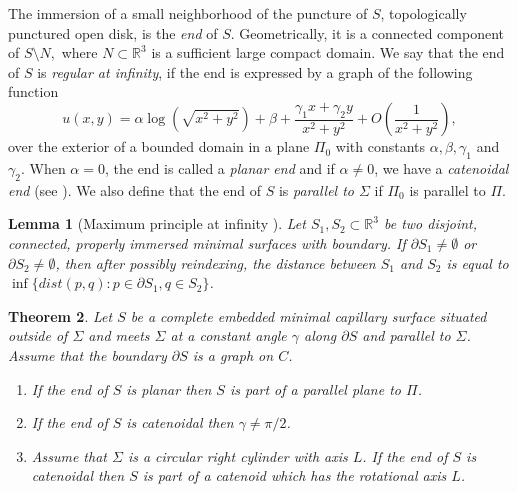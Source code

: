 \documentclass[12pt,a4paper]{amsart}
\newtheorem{theorem}{Theorem}
\newtheorem{lemma}[theorem]{Lemma}
\begin{document}
The immersion of a small neighborhood of the puncture of $S$, topologically punctured open disk, is the {\it end} of $S$. Geometrically, it is a connected component of $S\setminus N,$ where $N\subset{\mathbb R}^3$ is a sufficient large compact domain.
We say that the end of $S$ is {\it regular at infinity}, if the end is expressed by a graph of the following function
\begin{equation}\label{end}
u(x,y)=\alpha\log\left(\sqrt{x^2+y^2}\right)+\beta+\frac{\gamma_1x+\gamma_2y}{x^2+y^2}+O\left(\frac{1}{x^2+y^2}\right),
\end{equation}
over the exterior of a bounded domain in a plane $\Pi_0$ with constants $\alpha, \beta, \gamma_1$ and $\gamma_2$.
When $\alpha=0$, the end is called a {\it planar end} and if $\alpha\not=0$, we have a {\it catenoidal end} (see \cite{sch}).
We also define that the end of $S$ is {\it parallel to $\Sigma$} if $\Pi_0$ is parallel to $\Pi$.
\begin{lemma}[Maximum principle at infinity \cite{mr}] Let $S_1, S_2\subset {\mathbb R}^3$ be two disjoint, connected, properly immersed minimal surfaces with boundary. If $\partial S_1\not=\emptyset$ or $\partial S_2\not=\emptyset$, then after possibly reindexing, the distance between $S_1$ and $S_2$ is equal to $\inf \{dist(p,q) : p\in \partial S_1, q\in S_2\}$.
\end{lemma}
\begin{theorem}\label{t4}
Let $S$ be a complete embedded minimal capillary surface situated outside of $\Sigma$ and meets $\Sigma$ at a constant angle $\gamma$ along $\partial S$ and parallel to $\Sigma$. Assume that the boundary $\partial S$ is a graph on $C$.
\begin{enumerate}
\item If the end of $S$ is planar then $S$ is part of a parallel plane to $\Pi$.
\item If the end of $S$ is catenoidal then $\gamma\not=\pi/2$.
\item Assume that $\Sigma$ is a circular right cylinder with axis $L$. If the end of $S$ is catenoidal then $S$ is part of a catenoid which has the rotational axis $L$.
\end{enumerate}
\end{theorem}
\end{document}
